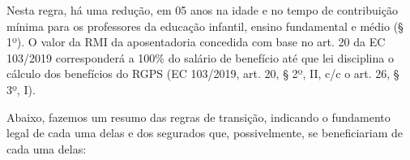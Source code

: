\documentclass[
  letterpaper,
  DIV=11,
  numbers=noendperiod]{scrartcl}
\begin{document}
Nesta regra, há uma redução, em 05 anos na idade e no tempo de
contribuição mínima para os professores da educação infantil, ensino
fundamental e médio (§ 1º). O valor da RMI da aposentadoria concedida
com base no art. 20 da EC 103/2019 corresponderá a 100\% do salário de
benefício até que lei disciplina o cálculo dos benefícios do RGPS (EC
103/2019, art. 20, § 2º, II, c/c o art. 26, § 3º, I).

Abaixo, fazemos um resumo das regras de transição, indicando o
fundamento legal de cada uma delas e dos segurados que, possivelmente,
se beneficiariam de cada uma delas:
\end{document}
